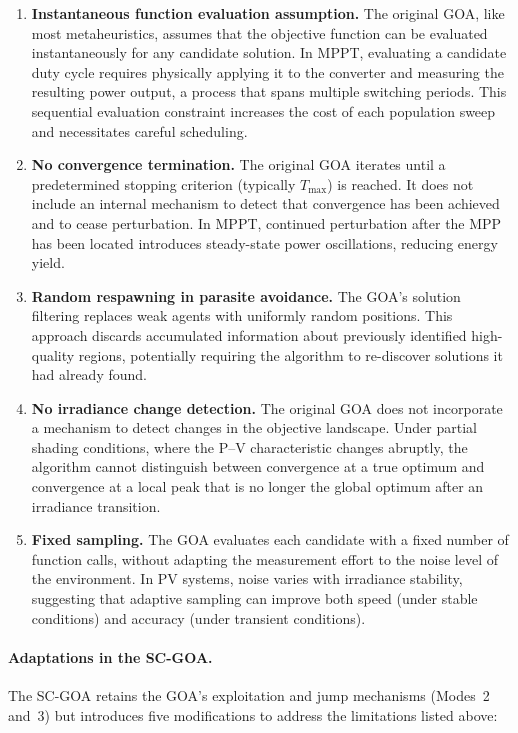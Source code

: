 \documentclass[a4paper, 12pt]{article}
\begin{document}
\begin{enumerate}[label=(\roman*)]
    \item \textbf{Instantaneous function evaluation assumption.} The original GOA, like most metaheuristics, assumes that the objective function can be evaluated instantaneously for any candidate solution. In MPPT, evaluating a candidate duty cycle requires physically applying it to the converter and measuring the resulting power output, a process that spans multiple switching periods. This sequential evaluation constraint increases the cost of each population sweep and necessitates careful scheduling.

    \item \textbf{No convergence termination.} The original GOA iterates until a predetermined stopping criterion (typically $T_{\max}$) is reached. It does not include an internal mechanism to detect that convergence has been achieved and to cease perturbation. In MPPT, continued perturbation after the MPP has been located introduces steady-state power oscillations, reducing energy yield.

    \item \textbf{Random respawning in parasite avoidance.} The GOA's solution filtering replaces weak agents with uniformly random positions. This approach discards accumulated information about previously identified high-quality regions, potentially requiring the algorithm to re-discover solutions it had already found.

    \item \textbf{No irradiance change detection.} The original GOA does not incorporate a mechanism to detect changes in the objective landscape. Under partial shading conditions, where the P--V characteristic changes abruptly, the algorithm cannot distinguish between convergence at a true optimum and convergence at a local peak that is no longer the global optimum after an irradiance transition.

    \item \textbf{Fixed sampling.} The GOA evaluates each candidate with a fixed number of function calls, without adapting the measurement effort to the noise level of the environment. In PV systems, noise varies with irradiance stability, suggesting that adaptive sampling can improve both speed (under stable conditions) and accuracy (under transient conditions).
\end{enumerate}

\paragraph{Adaptations in the SC-GOA.}
The SC-GOA retains the GOA's exploitation and jump mechanisms (Modes~2 and~3) but introduces five modifications to address the limitations listed above:
\end{document}
